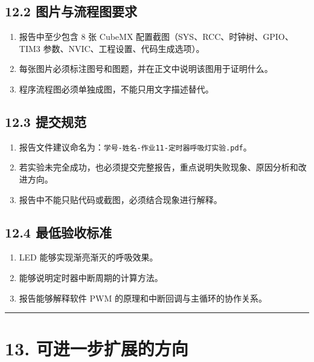 \documentclass[
  chinese,
  UTF8,
  oneside,
  openany]{ctexbook}
\providecommand{\tightlist}{%
  \setlength{\itemsep}{0pt}\setlength{\parskip}{0pt}}
\begin{document}
\subsection{12.2
图片与流程图要求}\label{ux56feux7247ux4e0eux6d41ux7a0bux56feux8981ux6c42-6}

\begin{enumerate}
\def\labelenumi{\arabic{enumi}.}
\tightlist
\item
  报告中至少包含 8 张 CubeMX 配置截图（SYS、RCC、时钟树、GPIO、TIM3
  参数、NVIC、工程设置、代码生成选项）。
\item
  每张图片必须标注图号和图题，并在正文中说明该图用于证明什么。
\item
  程序流程图必须单独成图，不能只用文字描述替代。
\end{enumerate}

\subsection{12.3 提交规范}\label{ux63d0ux4ea4ux89c4ux8303-6}

\begin{enumerate}
\def\labelenumi{\arabic{enumi}.}
\tightlist
\item
  报告文件建议命名为：\texttt{学号-姓名-作业11-定时器呼吸灯实验.pdf}。
\item
  若实验未完全成功，也必须提交完整报告，重点说明失败现象、原因分析和改进方向。
\item
  报告中不能只贴代码或截图，必须结合现象进行解释。
\end{enumerate}

\subsection{12.4
最低验收标准}\label{ux6700ux4f4eux9a8cux6536ux6807ux51c6-6}

\begin{enumerate}
\def\labelenumi{\arabic{enumi}.}
\tightlist
\item
  LED 能够实现渐亮渐灭的呼吸效果。
\item
  能够说明定时器中断周期的计算方法。
\item
  报告能够解释软件 PWM 的原理和中断回调与主循环的协作关系。
\end{enumerate}

\begin{center}\rule{0.5\linewidth}{0.5pt}\end{center}

\section{13.
可进一步扩展的方向}\label{ux53efux8fdbux4e00ux6b65ux6269ux5c55ux7684ux65b9ux5411-3}
\end{document}
